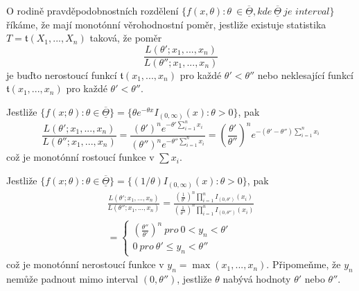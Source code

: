 \begin{definition}
O rodině pravděpodobnostních rozdělení $\{f(x, \theta): \theta\ \in \overline{\underline{\Theta}}, \textit{kde} ~ \overline{\underline{\Theta}} ~ \textit{je interval}\}$ říkáme, že mají monotónní věrohodnostní poměr, jestliže existuje statistika $T = \mathfrak{t}(X_1, ..., X_n)$ taková, že poměr
\begin{equation*}
\frac{L(\theta'; x_1, ..., x_n)}{L(\theta''; x_1, ..., x_n)}
\end{equation*}
je buďto nerostoucí funkcí $\mathfrak{t}(x_1, ..., x_n)$ pro každé $\theta' < \theta''$ nebo neklesající funkcí $\mathfrak{t}(x_1, ..., x_n)$ pro každé $\theta' < \theta''$.
\end{definition}

\begin{example}
Jestliže $\{f(x; \theta): \theta \in \overline{\underline{\Theta}}\} = \{\theta e^{-\theta x}I_{(0, \infty)}(x): \theta > 0\}$, pak
\begin{equation*}
\frac{L(\theta'; x_1, ..., x_n)}{L(\theta''; x_1, ..., x_n)} = \frac{(\theta')^n e^{-\theta' \sum_{i = 1}^n x_i}}{(\theta'')^n e^{-\theta'' \sum_{i = 1}^n x_i}} = \left(\frac{\theta'}{\theta''}\right)^n e^{-(\theta' - \theta'')\sum_{i = 1}^n x_i}
\end{equation*}
což je monotónní rostoucí funkce v $\sum x_i$.
\end{example}

\begin{example}
Jestliže $\{f(x; \theta): \theta \in \overline{\underline{\Theta}}\} = \{(1/\theta)I_{(0, \infty)}(x): \theta > 0\}$, pak
\begin{multline*}
\frac{L(\theta'; x_1, ..., x_n)}{L(\theta''; x_1, ..., x_n)} = \frac{\left(\frac{1}{\theta'}\right)^n \prod_{i = 1}^n I_{(0, \theta')}(x_i)}{\left(\frac{1}{\theta''}\right)^n \prod_{i = 1}^n I_{(0, \theta'')}(x_i)}\\
=
\begin{cases}
\left(\frac{\theta''}{\theta'}\right)^n ~ \textit{pro} ~ 0 < y_n < \theta'\\
0 ~ \textit{pro} ~ \theta' \le y_n < \theta''
\end{cases}
\end{multline*}
což je monotónní nerostoucí funkce v $y_n = \max(x_1, ..., x_n)$. Připomeňme, že $y_n$ nemůže padnout mimo interval $(0, \theta'')$, jestliže $\theta$ nabývá hodnoty $\theta'$ nebo $\theta''$.
\end{example}

